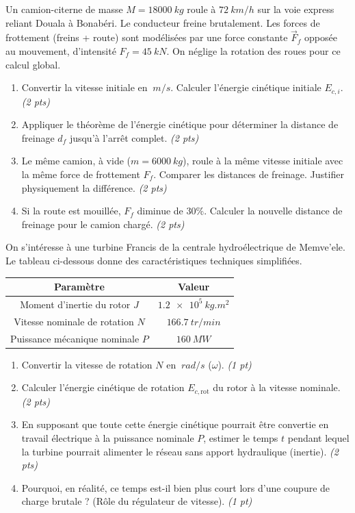 \documentclass[11pt]{article}
\begin{document}
\begin{exercice}
Un camion-citerne de masse $M = \SI{18000}{kg}$ roule à $\SI{72}{km/h}$ sur la voie express reliant Douala à Bonabéri. Le conducteur freine brutalement. Les forces de frottement (freins + route) sont modélisées par une force constante $\vec{F}_f$ opposée au mouvement, d'intensité $F_f = \SI{45}{kN}$. On néglige la rotation des roues pour ce calcul global.
\begin{enumerate}
    \item Convertir la vitesse initiale en $\SI{}{m/s}$. Calculer l'énergie cinétique initiale $E_{c,i}$. \textit{(2 pts)}
    \item Appliquer le théorème de l'énergie cinétique pour déterminer la distance de freinage $d_f$ jusqu'à l'arrêt complet. \textit{(2 pts)}
    \item Le même camion, à vide ($m = \SI{6000}{kg}$), roule à la même vitesse initiale avec la même force de frottement $F_f$. Comparer les distances de freinage. Justifier physiquement la différence. \textit{(2 pts)}
    \item Si la route est mouillée, $F_f$ diminue de $30\%$. Calculer la nouvelle distance de freinage pour le camion chargé. \textit{(2 pts)}
\end{enumerate}
\end{exercice}

\begin{exercice}
On s'intéresse à une turbine Francis de la centrale hydroélectrique de Memve'ele. Le tableau ci-dessous donne des caractéristiques techniques simplifiées.
\begin{center}
\begin{tabular}{|c|c|}
\hline
\textbf{Paramètre} & \textbf{Valeur} \\ \hline
Moment d'inertie du rotor $J$ & $\SI{1,2e5}{kg.m^2}$ \\ \hline
Vitesse nominale de rotation $N$ & $\SI{166,7}{tr/min}$ \\ \hline
Puissance mécanique nominale $P$ & $\SI{160}{MW}$ \\ \hline
\end{tabular}
\end{center}
\begin{enumerate}
    \item Convertir la vitesse de rotation $N$ en $\SI{}{rad/s}$ ($\omega$). \textit{(1 pt)}
    \item Calculer l'énergie cinétique de rotation $E_{c,\text{rot}}$ du rotor à la vitesse nominale. \textit{(2 pts)}
    \item En supposant que toute cette énergie cinétique pourrait être convertie en travail électrique à la puissance nominale $P$, estimer le temps $t$ pendant lequel la turbine pourrait alimenter le réseau sans apport hydraulique (inertie). \textit{(2 pts)}
    \item Pourquoi, en réalité, ce temps est-il bien plus court lors d'une coupure de charge brutale ? (Rôle du régulateur de vitesse). \textit{(1 pt)}
\end{enumerate}
\end{exercice}
\end{document}
